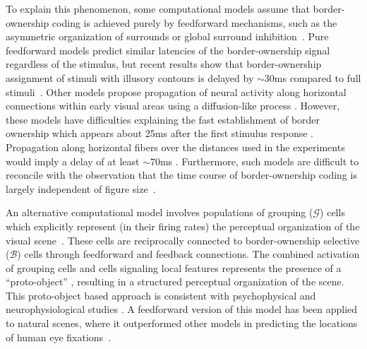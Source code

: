  To explain this phenomenon, some computational models assume that
border-ownership coding is achieved purely by feedforward mechanisms, such as the
asymmetric organization of surrounds \citep{Nishimura_Sakai04,
 Nishimura_Sakai05,Sakai_etal12} or global surround inhibition~\citep{Super_etal10}.
 Pure feedforward models predict similar latencies of the border-ownership signal regardless of the stimulus, but recent results show that border-ownership assignment of stimuli with illusory contours is delayed by $\sim30$ms compared to full stimuli~\citep{Hesse_Tsao16}.
  Other models propose
 propagation of neural
activity along horizontal connections within early visual
areas using a diffusion-like process \citep{Grossberg94, Sajda_Finkel95,
Baek_Sajda05, Kikuchi_Akashi01, Pao_etal99,
Zhaoping05,Zucker12}. However, these models have difficulties explaining the
fast establishment of border ownership which appears about 25ms after
the first stimulus response \citep{Zhou_etal00}.
 Propagation along horizontal fibers over the
distances used in the experiments would imply a delay of at least $\sim70$ms \citep[][based on the conduction velocity of horizontal fibers in primate V1 cortex; we are not aware of corresponding data for V2]{Girard_etal01}. Furthermore, such models are difficult to reconcile with the observation that the time course of border-ownership coding is largely independent of figure
size~\citep{Sugihara_etal11}.

An alternative computational model involves populations of grouping
($\mathcal{G}$) cells which explicitly represent (in their firing rates) the
perceptual organization of the visual
scene~\citep{Craft_etal07,Mihalas_etal11b}. These cells are reciprocally connected to
border-ownership selective ($\mathcal{B}$) cells through feedforward and
feedback connections.  The combined activation of grouping cells and cells
signaling local features represents the presence of a ``proto-object''
\citep[we borrow this term from the perception literature;][]{Rensink00a},
resulting in a structured perceptual
organization of the scene. 
This proto-object based approach is consistent with psychophysical and
neurophysiological studies
\citep[\eg][]{Duncan84,Egly_etal94,Scholl01,Kimchi_etal07,Qiu_etal07,Ho_Yeh09,Poort_etal12}. A feedforward version of this model
has been applied to natural scenes, where it outperformed other models
in predicting the locations of human eye
fixations~\citep{Russell_etal14}.

